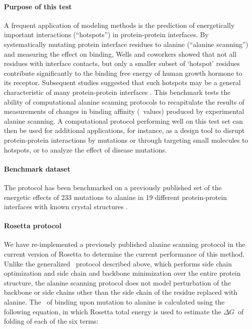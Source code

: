 \paragraph{Purpose of this test}

A frequent application of modeling methods is the prediction of energetically important interactions (``hotspots'') in protein-protein interfaces. By systematically mutating protein interface residues to alanine (``alanine scanning'') and measuring the effect on binding, Wells and coworkers \cite{clackson_hot_1995} showed that not all residues with interface contacts, but only a smaller subset of ‘hotspot’ residues contribute significantly to the binding free energy of human growth hormone to its receptor. Subsequent studies suggested that such hotspots may be a general characteristic of many protein-protein interfaces \cite{bogan_anatomy_1998,darnell_kfc_2008,zhu_kfc2:_2011}. This benchmark tests the ability of computational alanine scanning protocols to recapitulate the results of measurements of changes in binding affinity (\ddg\ values) produced by experimental alanine scanning. A computational protocol performing well on this test set can then be used for additional applications, for instance, as a design tool to disrupt protein-protein interactions by mutations or through targeting small molecules to hotspots, or to analyze the effect of disease mutations.

\paragraph{Benchmark dataset}

The protocol has been benchmarked on a previously published set of the energetic effects of 233 mutations to alanine in 19 different protein-protein interfaces with known crystal structures \cite{kortemme_simple_2002}.

\paragraph{Rosetta protocol}

We have re-implemented a previously published alanine scanning protocol \cite{kortemme_simple_2002,kortemme_computational_2004} in the current version of Rosetta to determine the current performance of this method. Unlike the generalized \ddg\ protocol described above, which performs side chain optimization and side chain and backbone minimization over the entire protein structure, the alanine scanning protocol does not model perturbation of the backbone or side chains other than the side chain of the residue replaced with alanine.
The \ddg\ of binding upon mutation to alanine is calculated using the following equation, in which Rosetta total energy is used to estimate the $\Delta G$\ of folding of each of the six terms:

